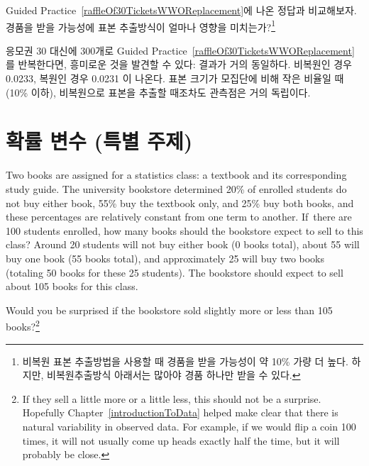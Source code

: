 \begin{exercise} \label{followUpToRaffleOf30TicketsWWOReplacement}
Guided Practice~\ref{raffleOf30TicketsWWOReplacement}에 나온 정답과 비교해보자. 경품을 받을 가능성에 표본 추출방식이 얼마나 영향을 미치는가?\footnote{비복원 표본 추출방법을 사용할 때 경품을 받을 가능성이 약 10\% 가량 더 높다. 하지만, 비복원추출방식 아래서는 많아야 경품 하나만 받을 수 있다.}
\end{exercise}

응모권 30 대신에 300개로 Guided Practice~\ref{raffleOf30TicketsWWOReplacement}를 반복한다면, 흥미로운 것을 발견할 수 있다: 결과가 거의 동일하다. 비복원인 경우 0.0233, 복원인 경우 0.0231 이 나온다. 표본 크기가 모집단에 비해 작은 비율일 때(10\% 이하), 비복원으로 표본을 추출할 때조차도 관측점은 거의 독립이다.

\textC{\newpage}



\section{확률 변수 (특별 주제)}
\label{randomVariablesSection}


\begin{example}{
Two books are assigned for a statistics class: a textbook and its corresponding study guide. The university bookstore determined 20\% of enrolled students do not buy either book, 55\% buy the textbook only, and 25\% buy both books, and these percentages are relatively constant from one term to another. If~there are 100 students enrolled, how many books should the bookstore expect to sell to this class?}\label{bookStoreSales}
Around 20 students will not buy either book (0 books total), about 55 will buy one book (55 books total), and approximately 25 will buy two books (totaling 50 books for these 25 students). The bookstore should expect to sell about 105 books for this class.
\end{example}

\begin{exercise}
Would you be surprised if the bookstore sold slightly more or less than 105 books?\footnote{If they sell a little more or a little less, this should not be a surprise. Hopefully Chapter~\ref{introductionToData} helped make clear that there is natural variability in observed data. For example, if we would flip a coin 100 times, it will not usually come up heads exactly half the time, but it will probably be close.}
\end{exercise}

